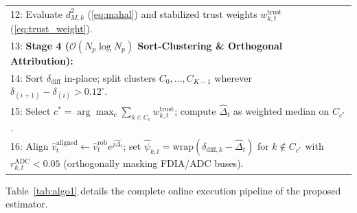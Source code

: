 \documentclass[journal,twoside]{IEEEtran}
\begin{document}
\begin{table}[!t]
\begin{tabular}{p{8.3cm}}
12: Evaluate $d_{M,k}^2$ (\ref{eq:mahal}) and stabilized trust weights $w_{k,t}^{\mathrm{trust}}$ (\ref{eq:trust_weight}). \\
13: \textbf{Stage 4 ($\mathcal{O}(N_p \log N_p)$ Sort-Clustering \& Orthogonal Attribution):} \\
14: Sort $\delta_{\mathrm{diff}}$ in-place; split clusters $C_0, \dots, C_{K-1}$ wherever $\delta_{(i+1)} - \delta_{(i)} > 0.12^\circ$. \\
15: Select $c^* = \arg\max_c \sum_{k \in C_c} w_{k,t}^{\mathrm{trust}}$; compute $\hat{\Delta}_t$ as weighted median on $C_{c^*}$. \\
16: Align $\hat{v}_t^{\mathrm{aligned}} \gets \hat{v}_t^{\mathrm{rob}}e^{j\hat{\Delta}_t}$; set $\hat{\psi}_{k,t} = \mathrm{wrap}(\delta_{\mathrm{diff},k} - \hat{\Delta}_t)$ for $k \notin C_{c^*}$ with $r_{k,t}^{\mathrm{ADC}} < 0.05$ (orthogonally masking FDIA/ADC buses). \\
\bottomrule
\end{tabular}
\end{table}

Table~\ref{tab:algo1} details the complete online execution pipeline of the proposed estimator.
\end{document}
